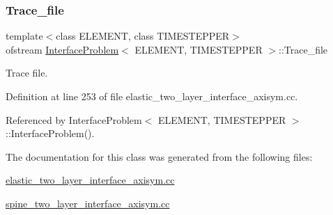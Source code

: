 \subsubsection{\texorpdfstring{Trace\+\_\+file}{Trace\_file}}
{\footnotesize\ttfamily template$<$class E\+L\+E\+M\+E\+NT, class T\+I\+M\+E\+S\+T\+E\+P\+P\+ER$>$ \\
ofstream \hyperlink{classInterfaceProblem}{Interface\+Problem}$<$ E\+L\+E\+M\+E\+NT, T\+I\+M\+E\+S\+T\+E\+P\+P\+ER $>$\+::Trace\+\_\+file\hspace{0.3cm}{\ttfamily [private]}}



Trace file. 



Definition at line 253 of file elastic\+\_\+two\+\_\+layer\+\_\+interface\+\_\+axisym.\+cc.



Referenced by Interface\+Problem$<$ E\+L\+E\+M\+E\+N\+T, T\+I\+M\+E\+S\+T\+E\+P\+P\+E\+R $>$\+::\+Interface\+Problem().



The documentation for this class was generated from the following files\+:\begin{DoxyCompactItemize}
\item 
\hyperlink{elastic__two__layer__interface__axisym_8cc}{elastic\+\_\+two\+\_\+layer\+\_\+interface\+\_\+axisym.\+cc}\item 
\hyperlink{spine__two__layer__interface__axisym_8cc}{spine\+\_\+two\+\_\+layer\+\_\+interface\+\_\+axisym.\+cc}\end{DoxyCompactItemize}
